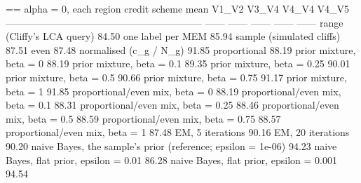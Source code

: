 == alpha = 0, each region
  credit scheme                                                   mean   V1_V2   V3_V4   V4_V4   V4_V5
  ------------------------------------------------------------  ------  ------  ------  ------  ------
  range (Cliffy's LCA query)                                    84.50%
  one label per MEM                                             85.94%
  sample (simulated cliffs)                                     87.51%
  even                                                          87.48%
  normalised (c_g / N_g)                                        91.85%
  proportional                                                  88.19%
  prior mixture, beta = 0                                       88.19%
  prior mixture, beta = 0.1                                     89.35%
  prior mixture, beta = 0.25                                    90.01%
  prior mixture, beta = 0.5                                     90.66%
  prior mixture, beta = 0.75                                    91.17%
  prior mixture, beta = 1                                       91.85%
  proportional/even mix, beta = 0                               88.19%
  proportional/even mix, beta = 0.1                             88.31%
  proportional/even mix, beta = 0.25                            88.46%
  proportional/even mix, beta = 0.5                             88.59%
  proportional/even mix, beta = 0.75                            88.57%
  proportional/even mix, beta = 1                               87.48%
  EM, 5 iterations                                              90.16%
  EM, 20 iterations                                             90.20%
  naive Bayes, the sample's prior (reference; epsilon = 1e-06)  94.23%
  naive Bayes, flat prior, epsilon = 0.01                       86.28%
  naive Bayes, flat prior, epsilon = 0.001                      94.54%

